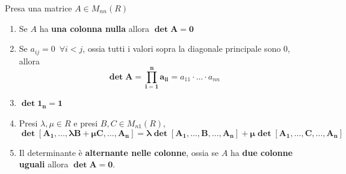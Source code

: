 \documentclass[11pt, a4paper, titlepage, oneside]{scrbook}
\begin{document}
\begin{Proprieta}
\label{prop-determinante}
Presa una matrice $A \in M_{nn}(R)$
\begin{enumerate}
    \item Se $A$ ha \textbf{una colonna nulla} allora $\bm{\det A = 0}$
    \item Se $a_{ij} = 0 \enspace \forall i < j$, ossia tutti i valori sopra la diagonale principale sono $0$, allora 
    \vspace{-0.3cm}
    \[\bm{\det A = \prod_{i = 1}^n a_{ii}} = a_{11} \cdot \ldots \cdot a_{nn}\]
    \item $\bm{\det 1_n = 1}$
    \item Presi $\lambda, \mu \in R$ e presi $B,C \in M_{n1}(R)$, 
    \vspace{-0.3cm}
    \[\bm{\det [A_1, \ldots, \lambda B + \mu C, \ldots, A_n] = \lambda \det[A_1, \ldots, B, \ldots, A_n] + \mu \det[A_1, \ldots, C, \ldots, A_n]}\]
    \vspace{-0.9cm}
    \item Il determinante è \textbf{alternante nelle colonne}, ossia se $A$ ha \textbf{due colonne uguali} allora $\bm{\det A = 0}$.
\end{enumerate}
\end{Proprieta}

\Dimostrazione \nopagebreak
\end{document}
